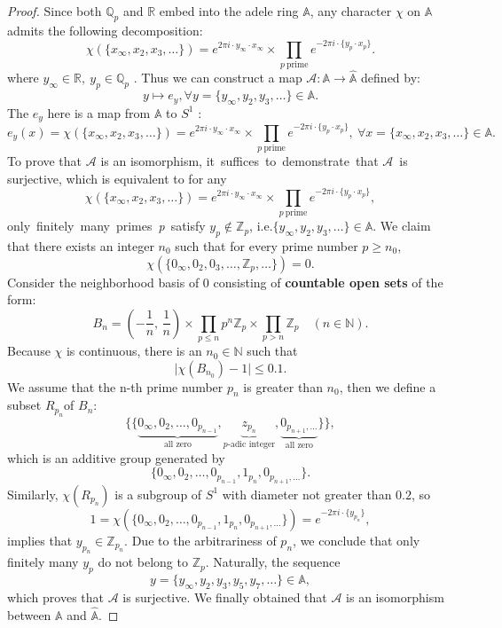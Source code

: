 \documentclass[11pt]{article}
\newcommand{\A}{\mathbb{A}}
\theoremstyle{remark}
\begin{document}
\begin{proof}
Since both \(\mathbb{Q}_p\) and $\mathbb{R}$ embed into the adele ring \(\mathbb{A}\), any character $\chi$ on \(\mathbb{A}\) admits the following decomposition: 
\[
\chi(\{x_\infty,x_2,x_3,\dots\})=e^{2\pi i\cdot y_\infty\cdot x_\infty}\times\prod\limits_{p\ \text{prime}}e^{-2\pi i\cdot \{y_p\cdot x_p\}}.
\]
    where $y_\infty \in \mathbb{R},\ y_p\in \mathbb{Q}_p$ . Thus we can construct a map $\mathcal{A}: \A\rightarrow\hat{\A} $ defined by:
    \[
    y\mapsto e_y, \forall y=\{y_{\infty},y_2,y_3,\dots\}\in \A.
    \]
    The $e_y$ here is a map from $\A $ to $S^1$ :
    \[ e_y(x)=\chi(\{x_\infty,x_2,x_3,\dots\})=e^{2\pi i\cdot y_\infty\cdot x_\infty}\times\prod\limits_{p\ \text{prime}}e^{-2\pi i\cdot \{y_p\cdot x_p\}},\ \forall x =\{x_\infty,x_2,x_3,\dots\}\in \A.\]
    To prove that $\mathcal{A}$ is an isomorphism, it suffices to demonstrate that $\mathcal{A}$ is surjective, which is equivalent to for any 
    \[
    \chi(\{x_\infty,x_2,x_3,\dots\})=e^{2\pi i\cdot y_\infty\cdot x_\infty}\times\prod\limits_{p\ \text{prime}}e^{-2\pi i\cdot \{y_p\cdot x_p\}},
    \]
    only finitely many primes \textit{p} satisfy \(y_p\notin \mathbb{Z}_p\), i.e.\(\{y_{\infty},y_2,y_3,\dots\}\in \A\).
    We claim that there exists an integer $n_0$ such that for every prime number $p\geq n_0$, \[
    \chi(\{0_\infty,0_2,0_3,\dots, \mathbb{Z}_p,\dots\})=0.
    \]
    Consider the neighborhood basis of $0$ consisting of \textbf{countable  open sets} of the form:
\[
B_n = \left( -\frac{1}{n},\, \frac{1}{n} \right) \times \prod_{p \leq n} p^{n}\mathbb{Z}_p \times \prod_{p > n} \mathbb{Z}_p \quad (n \in \mathbb{N}). 
\]
Because $\chi$ is continuous, there is an $n_0\in\mathbb{N}$ such that
\[
\lvert\chi(B_{n_0})-1\rvert\leq 0.1.
\]
We assume that the n-th prime number \( p_n \) is greater than \( n_0 \), then we define a subset $R_{p_n}$of $B_n$:
\[
\{\{\underbrace{0_\infty,0_2,\dots,0_{p_{n-1}}}_{\text{all zero}},\underbrace{z_{p_n}}_{p\text{-adic integer}}, \underbrace{0_{p_{n+1},\dots}}_{\text{all zero}}\}\},
\]
which is an additive group generated by
\[
\{0_\infty,0_2,\dots,0_{p_{n-1}},1_{p_n}, 0_{p_{n+1},\dots}\}.
\]
Similarly, $\chi(R_{p_n})$ is a subgroup of $S^1$ with diameter not greater than $0.2$, so
\[
1=\chi(\{0_\infty,0_2,\dots,0_{p_{n-1}},1_{p_n}, 0_{p_{n+1},\dots}\})=e^{-2\pi i\cdot \{y_{p_n}\}},
\]
implies that \(y_{p_n}\in \mathbb{Z}_{p_n}\). Due to the arbitrariness of $p_n$, we conclude that only finitely many \( y_p \) do not belong to \( \mathbb{Z}_p \). Naturally, the sequence
 \[
 y=\{y_\infty,y_2,y_3,y_5,y_7,\dots\}\in \A,
 \]
 which proves that $\mathcal{A}$ is surjective. We finally obtained that \(\mathcal{A}\) is an isomorphism between $\mathbb{A}$ and $\hat{\mathbb{A}}$.
 \end{proof}
\end{document}
